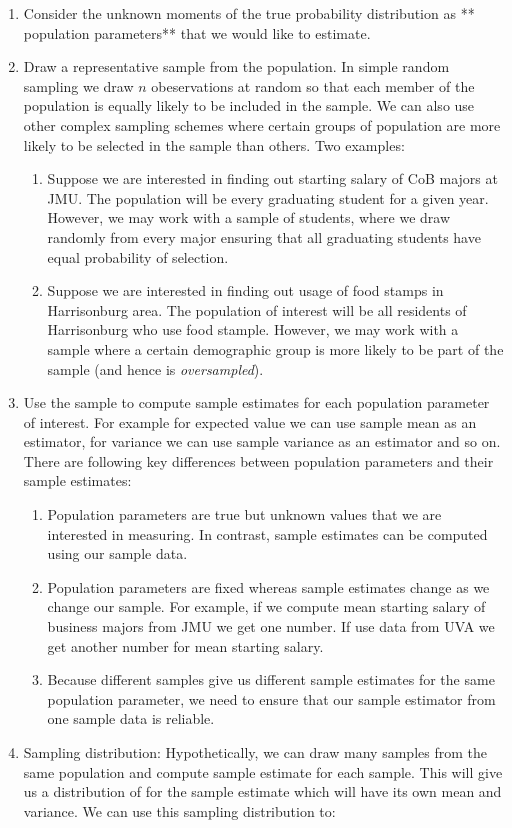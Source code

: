 \documentclass[]{book}
\theoremstyle{definition}
\theoremstyle{definition}
\theoremstyle{definition}
\theoremstyle{remark}
\begin{document}
\begin{enumerate}
\def\labelenumi{\arabic{enumi}.}
\item
  Consider the unknown moments of the true probability distribution as ** population parameters** that we would like to estimate.
\item
  Draw a representative sample from the population. In simple random sampling we draw \(n\) obeservations at random so that each member of the population is equally likely to be included in the sample. We can also use other complex sampling schemes where certain groups of population are more likely to be selected in the sample than others. Two examples:

  \begin{enumerate}
  \def\labelenumii{\alph{enumii}.}
  \item
    Suppose we are interested in finding out starting salary of CoB majors at JMU. The population will be every graduating student for a given year. However, we may work with a sample of students, where we draw randomly from every major ensuring that all graduating students have equal probability of selection.
  \item
    Suppose we are interested in finding out usage of food stamps in Harrisonburg area. The population of interest will be all residents of Harrisonburg who use food stample. However, we may work with a sample where a certain demographic group is more likely to be part of the sample (and hence is \emph{oversampled}).
  \end{enumerate}
\item
  Use the sample to compute sample estimates for each population parameter of interest. For example for expected value we can use sample mean as an estimator, for variance we can use sample variance as an estimator and so on. There are following key differences between population parameters and their sample estimates:

  \begin{enumerate}
  \def\labelenumii{\alph{enumii}.}
  \item
    Population parameters are true but unknown values that we are interested in measuring. In contrast, sample estimates can be computed using our sample data.
  \item
    Population parameters are fixed whereas sample estimates change as we change our sample. For example, if we compute mean starting salary of business majors from JMU we get one number. If use data from UVA we get another number for mean starting salary.
  \item
    Because different samples give us different sample estimates for the same population parameter, we need to ensure that our sample estimator from one sample data is reliable.
  \end{enumerate}
\item
  Sampling distribution: Hypothetically, we can draw many samples from the same population and compute sample estimate for each sample. This will give us a distribution of for the sample estimate which will have its own mean and variance. We can use this sampling distribution to:


\end{enumerate}
\end{document}
